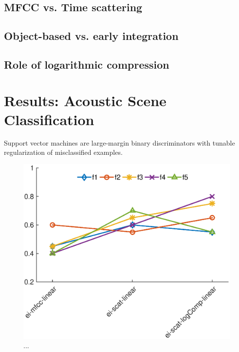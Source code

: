 \documentclass[journal]{IEEEtran}
\makeatletter
\newcommand*{\vs}{vs.\@\xspace}
\makeatother
\begin{document}
\subsection{MFCC \vs Time scattering}

\subsection{Object-based \vs early integration}

\subsection{Role of logarithmic compression}


\section{Results: Acoustic Scene Classification}
Support vector machines are large-margin binary discriminators with tunable regularization of misclassified examples.

\begin{figure}
\begin{center}
\includegraphics[width=\columnwidth]{gfx/supervised_linear_test1.eps}
\caption{...}
\end{center}
\end{figure}
\end{document}

